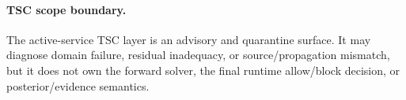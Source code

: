 \paragraph{TSC scope boundary.}
The active-service TSC layer is an advisory and quarantine surface. It may
diagnose domain failure, residual inadequacy, or source/propagation mismatch,
but it does not own the forward solver, the final runtime allow/block
decision, or posterior/evidence semantics.
